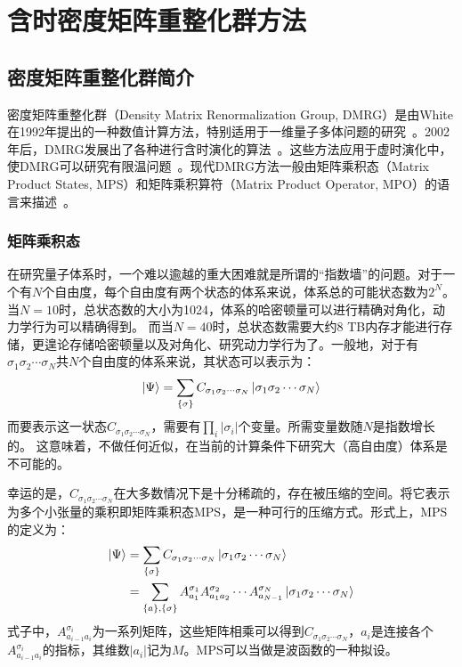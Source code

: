 \documentclass{article}
\begin{document}
\section{含时密度矩阵重整化群方法}
\subsection{密度矩阵重整化群简介}
密度矩阵重整化群（Density Matrix Renormalization Group, DMRG）是由White在1992年提出的一种数值计算方法，特别适用于一维量子多体问题的研究~\cite{White92, White93}。2002年后，DMRG发展出了各种进行含时演化的算法~\cite{Caza02, Luo03, Vidal04, White04, Delay04, White05td, Haeg11, Haeg16, Garnet09}。这些方法应用于虚时演化中，使DMRG可以研究有限温问题~\cite{Vers04, Zwolak04, White05ft, Bart13}。现代DMRG方法一般由矩阵乘积态（Matrix Product States, MPS）和矩阵乘积算符（Matrix Product Operator, MPO）的语言来描述~\cite{Schol11}。

\subsubsection{矩阵乘积态}

在研究量子体系时，一个难以逾越的重大困难就是所谓的“指数墙”的问题。对于一个有$N$个自由度，每个自由度有两个状态的体系来说，体系总的可能状态数为$2^N$。
当$N=10$时，总状态数的大小为1024，体系的哈密顿量可以进行精确对角化，动力学行为可以精确得到。
而当$N=40$时，总状态数需要大约8 TB内存才能进行存储，更遑论存储哈密顿量以及对角化、研究动力学行为了。一般地，对于有$\sigma_1\sigma_2\cdots\sigma_N $共$N$个自由度的体系来说，其状态可以表示为：
\begin{equation}
        | \Psi \rangle  = \sum_{\{\sigma\}} C_{\sigma_1\sigma_2\cdots\sigma_N }  \ket{ \sigma_1\sigma_2\cdots\sigma_N } 
\end{equation}
而要表示这一状态$C_{\sigma_1\sigma_2\cdots\sigma_N }$，需要有$\prod_i |\sigma_i|$个变量。所需变量数随$N$是指数增长的。
这意味着，不做任何近似，在当前的计算条件下研究大（高自由度）体系是不可能的。

幸运的是，$C_{\sigma_1\sigma_2\cdots\sigma_N }$在大多数情况下是十分稀疏的，存在被压缩的空间。将它表示为多个小张量的乘积即矩阵乘积态MPS，是一种可行的压缩方式。形式上，MPS的定义为：
\begin{equation}
\label{eq:mps-mps}
\begin{aligned}
    | \Psi \rangle & = \sum_{\{\sigma\}} C_{\sigma_1\sigma_2\cdots\sigma_N }  \ket{ \sigma_1\sigma_2\cdots\sigma_N } \\ 
    & = \sum_{\{a\},\{\sigma\}}
     A^{\sigma_1}_{a_1} A^{\sigma_2}_{a_1a_2} \cdots
           A^{\sigma_N}_{a_{N-1}}  \ket{ \sigma_1\sigma_2\cdots\sigma_N }
\end{aligned}
\end{equation}
式子中，$A^{\sigma_i}_{a_{i-1}a_{i}}$为一系列矩阵，这些矩阵相乘可以得到$C_{\sigma_1\sigma_2\cdots\sigma_N }$，$a_i$是连接各个$A^{\sigma_i}_{a_{i-1}a_{i}}$的指标，其维数$|a_i|$记为$M$。MPS可以当做是波函数的一种拟设。
\end{document}

